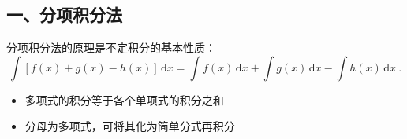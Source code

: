 
\begin{issues}
\issueDraft
\end{issues}


\subsection{一、分项积分法}
分项积分法的原理是不定积分的基本性质：
$$
\int \left[f(x)+g(x)-h(x)\right]\,\mathrm{d}x=\int f(x)\,\mathrm{d}x+\int g(x)\,\mathrm{d}x-\int h(x)\,\mathrm{d}x~.
$$

\begin{itemize}
\item 多项式的积分等于各个单项式的积分之和
\end{itemize}
\begin{itemize}
\item 分母为多项式，可将其化为简单分式再积分
\end{itemize}

